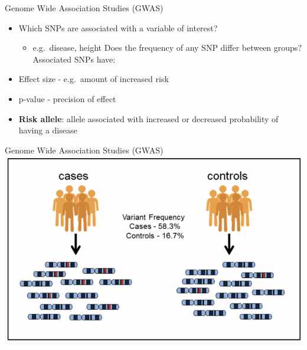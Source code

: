 \documentclass[
  ignorenonframetext,
]{beamer}
\providecommand{\tightlist}{%
  \setlength{\itemsep}{0pt}\setlength{\parskip}{0pt}}
\begin{document}
\begin{frame}{Genome Wide Association Studies (GWAS)}
\label{genome-wide-association-studies-gwas}
\Large

\begin{itemize}
\tightlist
\item
  Which SNPs are associated with a variable of interest?

  \begin{itemize}
  \tightlist
  \item
    e.g.~disease, height Does the frequency of any SNP differ between
    groups? Associated SNPs have:
  \end{itemize}
\item
  Effect size - e.g.~amount of increased risk
\item
  p-value - precision of effect
\item
  \textbf{Risk allele}: allele associated with increased or decreased
  probability of having a disease
\end{itemize}
\end{frame}

\begin{frame}{Genome Wide Association Studies (GWAS)}
\label{genome-wide-association-studies-gwas-1}
\includegraphics{figs/gwas.png}
\end{frame}
\end{document}
